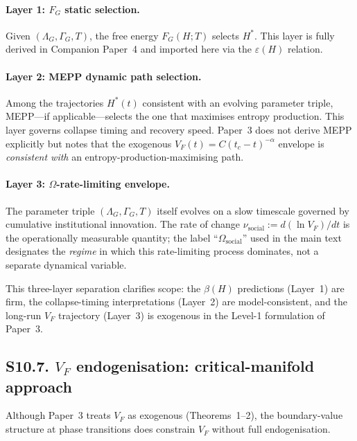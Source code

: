 \documentclass[11pt]{article}
\begin{document}
\paragraph{Layer 1: $F_G$ static selection.}
Given $(\Lambda_G, \Gamma_G, T)$, the free energy $F_G(H;T)$ selects $H^*$.
This layer is fully derived in Companion Paper~4 and imported here via the
$\varepsilon(H)$ relation.

\paragraph{Layer 2: MEPP dynamic path selection.}
Among the trajectories $H^*(t)$ consistent with an evolving parameter triple,
MEPP---if applicable---selects the one that maximises entropy production. This
layer governs collapse timing and recovery speed. Paper~3 does not derive MEPP
explicitly but notes that the exogenous $V_F(t) = C(t_c - t)^{-\alpha}$
envelope is \emph{consistent with} an entropy-production-maximising path.

\paragraph{Layer 3: $\Omega$-rate-limiting envelope.}
The parameter triple $(\Lambda_G, \Gamma_G, T)$ itself evolves on a slow
timescale governed by cumulative institutional innovation. The rate of change
$\nu_{\mathrm{social}} := d(\ln V_F)/dt$ is the operationally measurable
quantity; the label ``$\Omega_{\mathrm{social}}$'' used in the main text
designates the \emph{regime} in which this rate-limiting process dominates, not
a separate dynamical variable.

\noindent
This three-layer separation clarifies scope: the $\beta(H)$ predictions
(Layer~1) are firm, the collapse-timing interpretations (Layer~2) are
model-consistent, and the long-run $V_F$ trajectory (Layer~3) is exogenous in
the Level-1 formulation of Paper~3.

\subsection*{S10.7. $V_F$ endogenisation: critical-manifold approach}

Although Paper~3 treats $V_F$ as exogenous (Theorems~1--2), the boundary-value
structure at phase transitions does constrain $V_F$ without full endogenisation.
\end{document}
